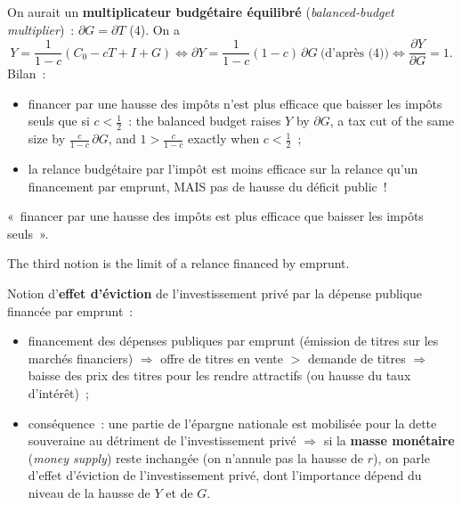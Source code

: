 \begin{example}
  On aurait un \textbf{multiplicateur budgétaire équilibré}
  (\textit{balanced-budget multiplier})~: $\partial G = \partial T$ (4). On a
  \[
    Y = \frac{1}{1 - c}\left( C_0 - cT + I + G \right)
    \iff
    \partial Y = \frac{1}{1 - c}(1 - c)\,\partial G \ \text{(d'après (4))}
    \iff
    \frac{\partial Y}{\partial G} = 1 .
  \]
  Bilan~:
  \begin{itemize}
    \item financer par une hausse des impôts n'est plus efficace que baisser les
      impôts seuls que si $c < \tfrac{1}{2}$~: the balanced budget raises $Y$ by
      $\partial G$, a tax cut of the same size by $\tfrac{c}{1 - c}\,\partial G$,
      and $1 > \tfrac{c}{1 - c}$ exactly when $c < \tfrac{1}{2}$~;
    \item la relance budgétaire par l'impôt est moins efficace sur la relance
      qu'un financement par emprunt, MAIS pas de hausse du déficit public~!
  \end{itemize}
\end{example}

\begin{remark}
  «~financer par une hausse des impôts est plus efficace que baisser les impôts
  seuls~».
\end{remark}

The third notion is the limit of a relance financed by emprunt.

\begin{definition}
  Notion d'\textbf{effet d'éviction} de l'investissement privé par la dépense
  publique financée par emprunt~:
  \begin{itemize}
    \item financement des dépenses publiques par emprunt (émission de titres sur
      les marchés financiers) $\Rightarrow$ offre de titres en vente $>$ demande
      de titres $\Rightarrow$ baisse des prix des titres pour les rendre
      attractifs (ou hausse du taux d'intérêt)~;
    \item conséquence~: une partie de l'épargne nationale est mobilisée pour la
      dette souveraine au détriment de l'investissement privé $\Rightarrow$ si la
      \textbf{masse monétaire} (\textit{money supply}) reste inchangée (on
      n'annule pas la hausse de $r$), on parle d'effet d'éviction de
      l'investissement privé, dont l'importance dépend du niveau de la hausse de
      $Y$ et de $G$.
  \end{itemize}
\end{definition}

